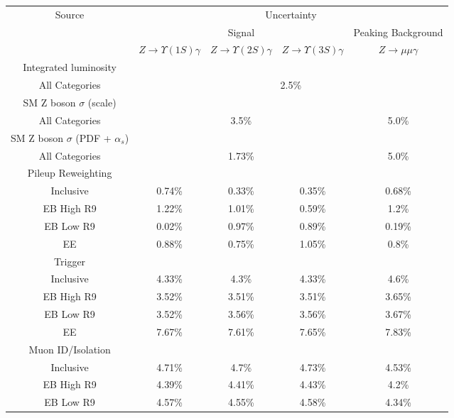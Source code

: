
\begin{tabular}{c|c|c|c|c}
\cline{1-5}
\multirow{3}{*}{Source} & \multicolumn{4}{c}{Uncertainty} \\
\cline{2-5}
& \multicolumn{3}{c|}{Signal} & Peaking Background   \\
\cline{2-5}
& $Z \rightarrow \Upsilon(1S)  \gamma$ & $Z \rightarrow \Upsilon(2S)  \gamma$ & $Z \rightarrow \Upsilon(3S)  \gamma$ & $Z \rightarrow \mu\mu\gamma$  \\
\hline\hline
Integrated luminosity & \multicolumn{4}{l}{} \\ \hline
All Categories & \multicolumn{4}{c}{2.5\%} \\
\hline\hline
SM Z boson $\sigma$ (scale) & \multicolumn{4}{l}{} \\ \hline
All Categories & \multicolumn{3}{c|}{3.5\%}  & \multicolumn{1}{c}{5.0\%} \\
\hline\hline
SM Z boson $\sigma$ (PDF + $\alpha_s$)  & \multicolumn{4}{l}{} \\ \hline
All Categories & \multicolumn{3}{c|}{1.73\%}  & \multicolumn{1}{c}{5.0\%} \\
\hline\hline
Pileup Reweighting  & \multicolumn{4}{l}{} \\ \hline
Inclusive & 0.74\% & 0.33\% & 0.35\% & 0.68\% \\
EB High R9 & 1.22\% & 1.01\% & 0.59\% & 1.2\% \\
EB Low R9 & 0.02\% & 0.97\% & 0.89\% & 0.19\% \\
EE & 0.88\% & 0.75\% & 1.05\% & 0.8\% \\
\hline\hline
Trigger  & \multicolumn{4}{l}{} \\ \hline
Inclusive & 4.33\% & 4.3\% & 4.33\% & 4.6\% \\
EB High R9 & 3.52\% & 3.51\% & 3.51\% & 3.65\% \\
EB Low R9 & 3.52\% & 3.56\% & 3.56\% & 3.67\% \\
EE & 7.67\% & 7.61\% & 7.65\% & 7.83\% \\
\hline\hline
Muon ID/Isolation & \multicolumn{4}{l}{} \\ \hline
Inclusive & 4.71\% & 4.7\% & 4.73\% & 4.53\% \\
EB High R9 & 4.39\% & 4.41\% & 4.43\% & 4.2\% \\
EB Low R9 & 4.57\% & 4.55\% & 4.58\% & 4.34\% \\

\end{tabular}
